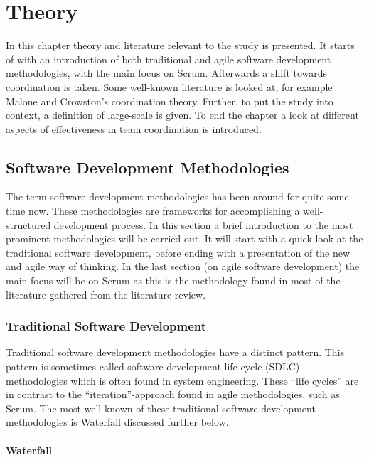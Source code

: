 \chapter{Theory}

\minitoc

In this chapter theory and literature relevant to the study is presented. It starts of with an introduction of both traditional and agile software development methodologies, with the main focus on Scrum. Afterwards a shift towards coordination is taken. Some well-known literature is looked at, for example Malone and Crowston's coordination theory. Further, to put the study into context, a definition of large-scale is given. To end the chapter a look at different aspects of effectiveness in team coordination is introduced.

\newpage

\section{Software Development Methodologies}

The term software development methodologies has been around for quite some time now. These methodologies are frameworks for accomplishing a well-structured development process. In this section a brief introduction to the most prominent methodologies will be carried out. It will start with a quick look at the traditional software development, before ending with a presentation of the new and agile way of thinking. In the last section (on agile software development) the main focus will be on Scrum as this is the methodology found in most of the literature gathered from the literature review.

\subsection{Traditional Software Development}

Traditional software development methodologies have a distinct pattern. This pattern is sometimes called software development life cycle (SDLC) methodologies which is often found in system engineering. These ``life cycles'' are in contrast to the ``iteration''-approach found in agile methodologies, such as Scrum. The most well-known of these traditional software development methodologies is Waterfall discussed further below.

\subsubsection{Waterfall}


